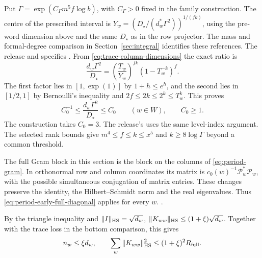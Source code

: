 Put \(\Gamma=\exp(C_\Gamma m^5 f\log b)\), with \(C_\Gamma>0\) fixed
in the family construction. The centre of the prescribed interval is
\(Y_w=(D_\star/(d_w^*\Gamma^2))^{1/(fk)}\), using the pre-word
dimension above and the same \(D_\star\) as in the row projector.
The mass and formal-degree comparison in
Section~\ref{sec:integral} identifies these references. The release
and specifies
.
From \eqref{eq:trace-column-dimensions} the exact ratio is
\[
 \frac{d_w\Gamma^2}{D_\star}=
 \left(\frac{T_w}{Y_w}\right)^{fk}(1-T_w^{-k})^f .
\]
The first factor lies in \([1,\exp(1)]\) by \(1+h\le e^h\), and the
second lies in \([1/2,1]\) by Bernoulli's inequality and
\(2f\le 2k\le 2^k\le T_w^k\). This proves
\begin{equation}
 \label{eq:trace-balance}
 C_0^{-1}\le \frac{d_w\Gamma^2}{D_\star}\le C_0
 \qquad(w\in W), \qquad C_0\ge1.
\end{equation}
The construction takes \(C_0=3\).
The release's
uses the same level-index argument. The selected rank bounds give
\(m^4\le f\le k\le x^5\) and \(k\ge 8\log\Gamma\) beyond a common
threshold.

\leavevmode{}%
The full Gram block in this section is the block on the columns of
\eqref{eq:period-gram}. In orthonormal row and column coordinates its
matrix is \(c_0(w)^{-1}\mathcal P_w^*\mathcal P_w\), with the possible
simultaneous conjugation of matrix entries. These changes preserve
the identity, the Hilbert--Schmidt norm and the real eigenvalues.
Thus \eqref{eq:period-early-full-diagonal} applies for every \(w\).
.

\leavevmode{}%
By the triangle inequality and \(\|I\|_{\rm HS}=\sqrt{d_w}\),
\(\|K_{ww}\|_{\rm HS}\le(1+\xi)\sqrt{d_w}\). Together with the trace
loss in the bottom comparison, this gives
\begin{equation}
\label{eq:trace-one-sided-diagonal}
 n_w\le\xi d_w,\qquad
 \sum_w\|K_{ww}\|_{\rm HS}^2\le(1+\xi)^2R_{\mathrm{full}} .
\end{equation}

